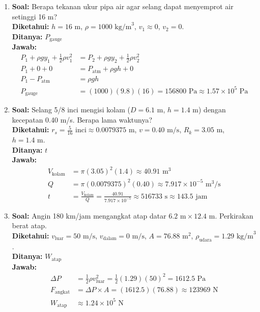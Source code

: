 \documentclass[twocolumn]{article}
\begin{document}
\begin{enumerate}
    \item \textbf{Soal:} Berapa tekanan ukur pipa air agar selang dapat menyemprot air setinggi 16 m? \\
    \textbf{Diketahui:} $h = 16 \text{ m}$, $\rho = 1000 \text{ kg/m}^3$, $v_1 \approx 0$, $v_2 = 0$. \\
    \textbf{Ditanya:} $P_{\text{gauge}}$ \\
    \textbf{Jawab:}
    \begin{align*}
        P_1 + \rho g y_1 + \frac{1}{2}\rho v_1^2 &= P_2 + \rho g y_2 + \frac{1}{2}\rho v_2^2 \\
        P_1 + 0 + 0 &= P_{\text{atm}} + \rho g h + 0 \\
        P_1 - P_{\text{atm}} &= \rho g h \\
        P_{\text{gauge}} &= (1000)(9.8)(16) = 156800 \text{ Pa} \approx 1.57 \times 10^5 \text{ Pa}
    \end{align*}

    \item \textbf{Soal:} Selang 5/8 inci mengisi kolam ($D = 6.1 \text{ m}$, $h = 1.4 \text{ m}$) dengan kecepatan 0.40 m/s. Berapa lama waktunya? \\
    \textbf{Diketahui:} $r_s = \frac{5}{16} \text{ inci} \approx 0.0079375 \text{ m}$, $v = 0.40 \text{ m/s}$, $R_k = 3.05 \text{ m}$, $h = 1.4 \text{ m}$. \\
    \textbf{Ditanya:} $t$ \\
    \textbf{Jawab:}
    \begin{align*}
        V_{\text{kolam}} &= \pi (3.05)^2 (1.4) \approx 40.91 \text{ m}^3 \\
        Q &= \pi (0.0079375)^2 (0.40) \approx 7.917 \times 10^{-5} \text{ m}^3/\text{s} \\
        t &= \frac{V_{\text{kolam}}}{Q} = \frac{40.91}{7.917 \times 10^{-5}} \approx 516733 \text{ s} \approx 143.5 \text{ jam}
    \end{align*}

    \item \textbf{Soal:} Angin 180 km/jam mengangkat atap datar $6.2 \text{ m} \times 12.4 \text{ m}$. Perkirakan berat atap. \\
    \textbf{Diketahui:} $v_{\text{luar}} = 50 \text{ m/s}$, $v_{\text{dalam}} = 0 \text{ m/s}$, $A = 76.88 \text{ m}^2$, $\rho_{\text{udara}} = 1.29 \text{ kg/m}^3$. \\
    \textbf{Ditanya:} $W_{\text{atap}}$ \\
    \textbf{Jawab:}
    \begin{align*}
        \Delta P &= \frac{1}{2}\rho v_{\text{luar}}^2 = \frac{1}{2}(1.29)(50)^2 = 1612.5 \text{ Pa} \\
        F_{\text{angkat}} &= \Delta P \times A = (1612.5)(76.88) \approx 123969 \text{ N} \\
        W_{\text{atap}} &\approx 1.24 \times 10^5 \text{ N}
    \end{align*}


\end{enumerate}
\end{document}
